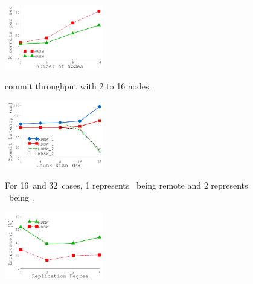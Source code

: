 {
\begin{figure}[th]
\begin{minipage}{1.69in}
\begin{center}
\centerline{\includegraphics[width=1.69in]{Figures/g_plot_SOCC_node.pdf}}
{
commit throughput with 2 to 16 nodes.
}
\end{center}
\end{minipage}
\begin{minipage}{0.01in}
\hspace{0.01in}
\end{minipage}
\begin{minipage}{1.70in}
\begin{center}
\centerline{\includegraphics[width=1.70in]{Figures/g_plot_SOCC_chunksize.pdf}}
{
For 16\MB\ and 32\MB\ cases, 1 represents \on\ being remote and 2 represents \xn\ being \on. 
}
\end{center}
\end{minipage}
\begin{minipage}{0.01in}
\hspace{0.01in}
\end{minipage}
\begin{minipage}{1.70in}
\begin{center}
\centerline{\includegraphics[width=1.70in]{Figures/g_plot_SOCC_migration.pdf}}

\end{center}
\end{minipage}
\end{figure}}
